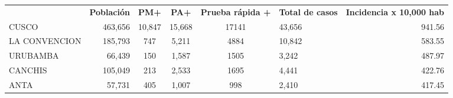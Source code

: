 \begin{tabular}{lrccclr}
	\rowcolor[HTML]{DCE6F1} 
	\multicolumn{1}{c}{\cellcolor[HTML]{DCE6F1}\textbf{PROVINCIA}} & \multicolumn{1}{c}{\cellcolor[HTML]{DCE6F1}\textbf{Población}} & \textbf{PM+}                                                & \textbf{PA+}         & \textbf{Prueba rápida +} & \multicolumn{1}{c}{\cellcolor[HTML]{DCE6F1}\textbf{Total de casos}} & \multicolumn{1}{c}{\cellcolor[HTML]{DCE6F1}\textbf{Incidencia x 10,000 hab}} \\
	\cellcolor[HTML]{FF5050}CUSCO                                  & 463,656                                                        & 10,847                                                      & 15,668               & 17141                    & 43,656                                                              & 941.56                                                                       \\
	\cellcolor[HTML]{F4B084}LA   CONVENCION                        & 185,793                                                        & 747                                                         & 5,211                & 4884                     & 10,842                                                              & 583.55                                                                       \\
	\cellcolor[HTML]{F4B084}URUBAMBA                               & 66,439                                                         & 150                                                         & 1,587                & 1505                     & 3,242                                                               & 487.97                                                                       \\
	\cellcolor[HTML]{FFE699}CANCHIS                                & 105,049                                                        & 213                                                         & 2,533                & 1695                     & 4,441                                                               & 422.76                                                                       \\
	\cellcolor[HTML]{FFE699}ANTA                                   & 57,731                                                         & 405                                                         & 1,007                & 998                      & 2,410                                                               & 417.45                                                                       \\

\end{tabular}
